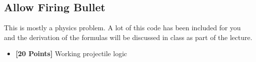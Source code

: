 \documentclass[letterpaper,10pt,english]{sphinxmanual}
\begin{document}
\subsection{Allow Firing Bullet}
\label{week_3/index:allow-firing-bullet}
This is mostly a physics problem. A lot of this code has been included for you and the derivation of the formulas will be discussed in class as part of the lecture.
\begin{itemize}
\item {} 
\textbf{{[}20 Points{]}} Working projectile logic

\end{itemize}



\renewcommand{\indexname}{Index}
\printindex
\end{document}

